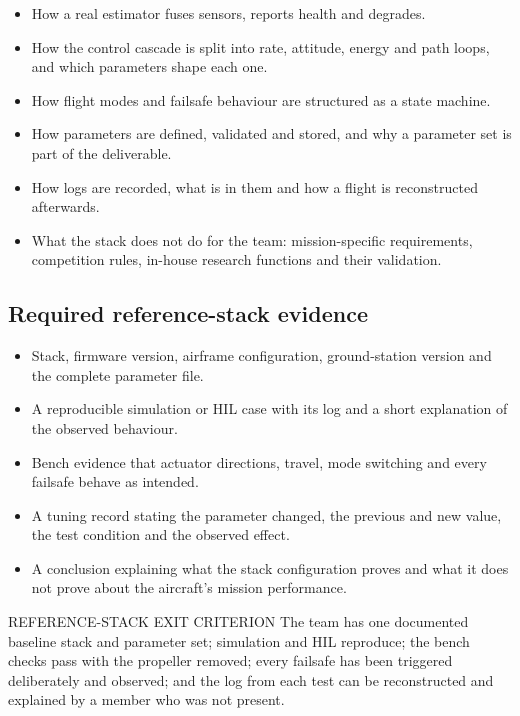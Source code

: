 \documentclass[11pt,a4paper]{article}
\begin{document}
\begin{itemize}
  \item How a real estimator fuses sensors, reports health and degrades.
  \item How the control cascade is split into rate, attitude, energy and path loops, and which parameters shape each one.
  \item How flight modes and failsafe behaviour are structured as a state machine.
  \item How parameters are defined, validated and stored, and why a parameter set is part of the deliverable.
  \item How logs are recorded, what is in them and how a flight is reconstructed afterwards.
  \item What the stack does not do for the team: mission-specific requirements, competition rules, in-house research functions and their validation.
\end{itemize}

\subsection{Required reference-stack evidence}

\begin{itemize}
  \item Stack, firmware version, airframe configuration, ground-station version and the complete parameter file.
  \item A reproducible simulation or HIL case with its log and a short explanation of the observed behaviour.
  \item Bench evidence that actuator directions, travel, mode switching and every failsafe behave as intended.
  \item A tuning record stating the parameter changed, the previous and new value, the test condition and the observed effect.
  \item A conclusion explaining what the stack configuration proves and what it does not prove about the aircraft's mission performance.
\end{itemize}

\begin{warningbox}{REFERENCE-STACK EXIT CRITERION}
  The team has one documented baseline stack and parameter set; simulation and
  HIL reproduce; the bench checks pass with the propeller removed; every
  failsafe has been triggered deliberately and observed; and the log from each
  test can be reconstructed and explained by a member who was not present.
\end{warningbox}
\end{document}
